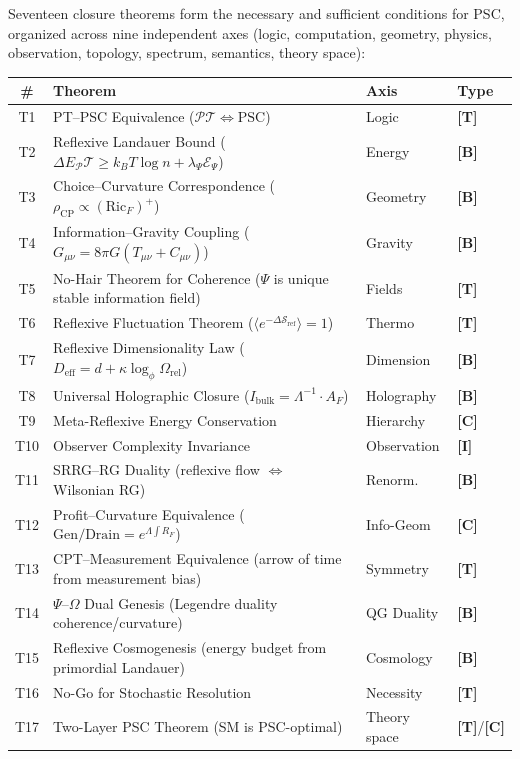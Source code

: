 \documentclass[11pt]{article}
\newcommand{\PT}{\mathcal{P}\mathcal{T}}
\newcommand{\PSC}{\text{PSC}}
\newcommand{\tagT}{\textbf{[T]}}
\newcommand{\tagB}{\textbf{[B]}}
\newcommand{\tagC}{\textbf{[C]}}
\newcommand{\tagI}{\textbf{[I]}}
\theoremstyle{plain}
\theoremstyle{definition}
\theoremstyle{remark}
\begin{document}
Seventeen closure theorems form the necessary and sufficient conditions for PSC,
organized across nine independent axes (logic, computation, geometry, physics,
observation, topology, spectrum, semantics, theory space):

\medskip
\begin{center}
\small
\setlength{\tabcolsep}{4pt}
\begin{tabular}{@{}clll@{}}
\toprule
\# & Theorem & Axis & Type \\
\midrule
T1  & PT--PSC Equivalence ($\PT \Leftrightarrow \PSC$) & Logic & \tagT{} \\
T2  & Reflexive Landauer Bound ($\Delta E_\PT \ge k_BT\log n + \lambda_\Psi \mathcal{E}_\Psi$) & Energy & \tagB{} \\
T3  & Choice--Curvature Correspondence ($\rho_\mathrm{CP} \propto (\mathrm{Ric}_F)^+$) & Geometry & \tagB{} \\
T4  & Information--Gravity Coupling ($G_{\mu\nu} = 8\pi G(T_{\mu\nu} + C_{\mu\nu})$) & Gravity & \tagB{} \\
T5  & No-Hair Theorem for Coherence ($\Psi$ is unique stable information field) & Fields & \tagT{} \\
T6  & Reflexive Fluctuation Theorem ($\langle e^{-\Delta\mathcal{S}_\mathrm{ref}}\rangle = 1$) & Thermo & \tagT{} \\
T7  & Reflexive Dimensionality Law ($D_\mathrm{eff} = d + \kappa\log_\phi\Omega_\mathrm{rel}$) & Dimension & \tagB{} \\
T8  & Universal Holographic Closure ($I_\mathrm{bulk} = \Lambda^{-1} \cdot A_F$) & Holography & \tagB{} \\
T9  & Meta-Reflexive Energy Conservation & Hierarchy & \tagC{} \\
T10 & Observer Complexity Invariance & Observation & \tagI{} \\
T11 & SRRG--RG Duality (reflexive flow $\Leftrightarrow$ Wilsonian RG) & Renorm. & \tagB{} \\
T12 & Profit--Curvature Equivalence ($\mathrm{Gen/Drain} = e^{\Lambda\int R_F}$) & Info-Geom & \tagC{} \\
T13 & CPT--Measurement Equivalence (arrow of time from measurement bias) & Symmetry & \tagT{} \\
T14 & $\Psi$--$\Omega$ Dual Genesis (Legendre duality coherence/curvature) & QG Duality & \tagB{} \\
T15 & Reflexive Cosmogenesis (energy budget from primordial Landauer) & Cosmology & \tagB{} \\
T16 & No-Go for Stochastic Resolution & Necessity & \tagT{} \\
T17 & Two-Layer PSC Theorem (SM is PSC-optimal) & Theory space & \tagT{}/\tagC{} \\
\bottomrule
\end{tabular}
\end{center}
\end{document}
